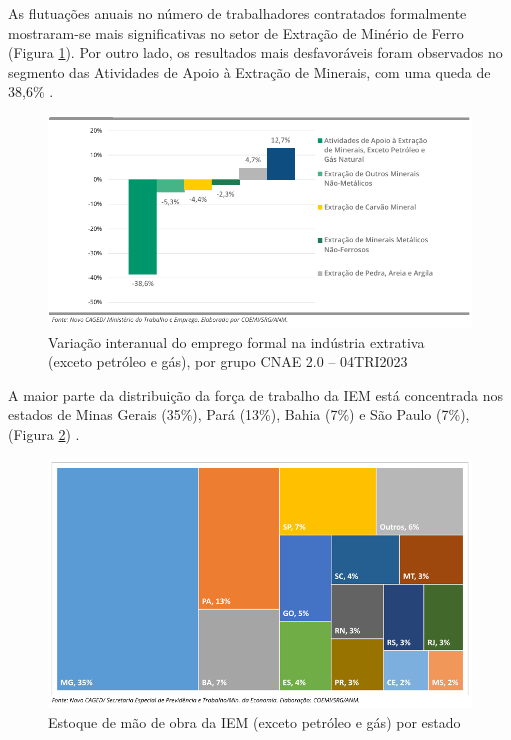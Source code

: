 As flutuações anuais no número de trabalhadores contratados formalmente mostraram-se mais significativas no setor de Extração de Minério de Ferro (Figura \ref{fig:variacao_emprego_4tri2023}). Por outro lado, os resultados mais desfavoráveis foram observados no segmento das Atividades de Apoio à Extração de Minerais, com uma queda de 38,6\% \cite{anm2023informe4}.

\begin{figure}[!htb]
    \centering
    \includegraphics[width=\textwidth]{figures/image7_variacao_emprego_4tri2023.png}
    \caption{Variação interanual do emprego formal na indústria extrativa (exceto petróleo e gás), por grupo CNAE 2.0 -- 04TRI2023}
    \label{fig:variacao_emprego_4tri2023}
\end{figure}

A maior parte da distribuição da força de trabalho da IEM está concentrada nos estados de Minas Gerais (35\%), Pará (13\%), Bahia (7\%) e São Paulo (7\%), (Figura \ref{fig:estoque_mao_obra}) \cite{anm2023informe3}.

\begin{figure}[!htb]
    \centering
    \includegraphics[width=\textwidth]{figures/image8_estoque_mao_obra.png}
    \caption{Estoque de mão de obra da IEM (exceto petróleo e gás) por estado}
    \label{fig:estoque_mao_obra}
\end{figure}

